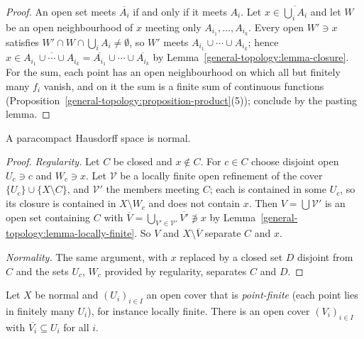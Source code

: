 \begin{proof}
An open set meets $\overline{A_i}$ if and only if it meets $A_i$. Let $x \in \overline{\bigcup_i A_i}$ and let $W$ be an open neighbourhood of $x$ meeting only
$A_{i_1}, \ldots, A_{i_k}$. Every open $W' \ni x$ satisfies $W' \cap W \cap \bigcup_i A_i \neq \emptyset$, so $W'$ meets $A_{i_1} \cup \cdots \cup A_{i_k}$; hence
$x \in \overline{A_{i_1} \cup \cdots \cup A_{i_k}} = \overline{A_{i_1}} \cup \cdots \cup \overline{A_{i_k}}$ by Lemma~\ref{general-topology:lemma-closure}. For the
sum, each point has an open neighbourhood on which all but finitely many $f_i$ vanish, and on it the sum is a finite sum of continuous functions
(Proposition~\ref{general-topology:proposition-product}(5)); conclude by the pasting lemma.
\end{proof}

\begin{proposition}\label{general-topology:proposition-paracompact-normal}
A paracompact Hausdorff space is normal.
\end{proposition}

\begin{proof}
\emph{Regularity.} Let $C$ be closed and $x \notin C$. For $c \in C$ choose disjoint open $U_c \ni c$ and $W_c \ni x$. Let $\mathcal{V}$ be a locally finite
open refinement of the cover $\{U_c\} \cup \{X \setminus C\}$, and $\mathcal{V}'$ the members meeting $C$; each is contained in some $U_c$, so its closure is
contained in $X \setminus W_c$ and does not contain $x$. Then $V = \bigcup \mathcal{V}'$ is an open set containing $C$ with
$\overline{V} = \bigcup_{V' \in \mathcal{V}'} \overline{V'} \not\ni x$ by Lemma~\ref{general-topology:lemma-locally-finite}. So $V$ and $X \setminus \overline{V}$
separate $C$ and $x$.

\emph{Normality.} The same argument, with $x$ replaced by a closed set $D$ disjoint from $C$ and the sets $U_c$, $W_c$ provided by regularity, separates
$C$ and $D$.
\end{proof}

\begin{lemma}\label{general-topology:lemma-shrinking}
Let $X$ be normal and $(U_i)_{i \in I}$ an open cover that is \emph{point-finite} (each point lies in finitely many $U_i$), for instance locally finite.
There is an open cover $(V_i)_{i \in I}$ with $\overline{V_i} \subseteq U_i$ for all $i$.
\end{lemma}

